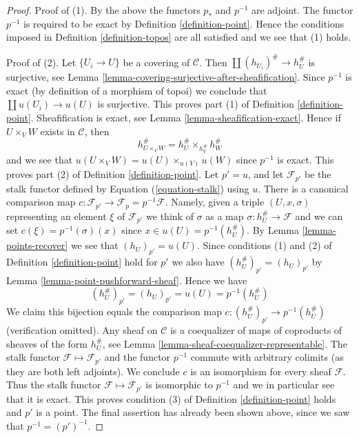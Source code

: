 \begin{proof}
Proof of (1). By the above the functors $p_*$ and $p^{-1}$ are adjoint.
The functor $p^{-1}$ is required to be exact by
Definition \ref{definition-point}.
Hence the conditions imposed in
Definition \ref{definition-topos}
are all satisfied and we see that (1) holds.

\medskip\noindent
Proof of (2). Let $\{U_i \to U\}$ be a covering of $\mathcal{C}$.
Then $\coprod (h_{U_i})^\# \to h_U^\#$ is surjective, see
Lemma \ref{lemma-covering-surjective-after-sheafification}.
Since $p^{-1}$ is exact (by definition of a morphism of topoi) we conclude
that $\coprod u(U_i) \to u(U)$ is surjective.
This proves part (1) of
Definition \ref{definition-point}.
Sheafification is exact, see
Lemma \ref{lemma-sheafification-exact}.
Hence if $U \times_V W$ exists in $\mathcal{C}$, then
$$
h_{U \times_V W}^\# =  h_U^\# \times_{h_V^\#} h_W^\#
$$
and we see that $u(U \times_V W) = u(U) \times_{u(V)} u(W)$ since $p^{-1}$
is exact. This proves part (2) of
Definition \ref{definition-point}.
Let $p' = u$, and let $\mathcal{F}_{p'}$ be the stalk functor
defined by Equation (\ref{equation-stalk}) using $u$. There is
a canonical comparison map
$c : \mathcal{F}_{p'} \to \mathcal{F}_p = p^{-1}\mathcal{F}$.
Namely, given a triple $(U, x, \sigma)$ representing an element $\xi$
of $\mathcal{F}_{p'}$ we think of $\sigma$ as a map
$\sigma : h_U^\# \to \mathcal{F}$ and we can set
$c(\xi) = p^{-1}(\sigma)(x)$ since $x \in u(U) = p^{-1}(h_U^\#)$. By
Lemma \ref{lemma-points-recover}
we see that $(h_U)_{p'} = u(U)$. Since conditions (1) and (2) of
Definition \ref{definition-point}
hold for $p'$ we also have $(h_U^\#)_{p'} = (h_U)_{p'}$ by
Lemma \ref{lemma-point-pushforward-sheaf}.
Hence we have
$$
(h_U^\#)_{p'} = (h_U)_{p'} = u(U) = p^{-1}(h_U^\#)
$$
We claim this bijection equals the comparison map
$c : (h_U^\#)_{p'} \to p^{-1}(h_U^\#)$ (verification omitted).
Any sheaf on $\mathcal{C}$ is a coequalizer of maps
of coproducts of sheaves of the form $h_U^\#$, see
Lemma \ref{lemma-sheaf-coequalizer-representable}.
The stalk functor $\mathcal{F} \mapsto \mathcal{F}_{p'}$ and
the functor $p^{-1}$ commute with arbitrary colimits (as they
are both left adjoints).
We conclude $c$ is an isomorphism for every sheaf $\mathcal{F}$.
Thus the stalk functor $\mathcal{F} \mapsto \mathcal{F}_{p'}$
is isomorphic to $p^{-1}$ and we in particular see that it is exact.
This proves condition (3) of
Definition \ref{definition-point}
holds and $p'$ is a point. The final assertion has already been shown
above, since we saw that $p^{-1} = (p')^{-1}$.
\end{proof}

